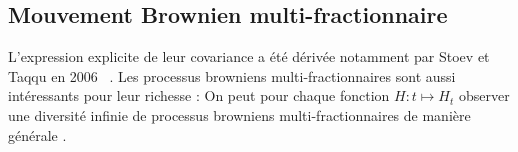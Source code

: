 \subsection{Mouvement Brownien multi-fractionnaire}

L'expression explicite de leur covariance a été dérivée notamment par Stoev et Taqqu en 2006 ~\cite{mfbm-howrich}. Les processus browniens multi-fractionnaires sont aussi intéressants pour leur \og richesse \fg : On peut pour chaque fonction $H : t \mapsto H_t$ observer \og une diversité infinie de processus browniens multi-fractionnaires de manière générale \fg.~\cite{mfbm-howrich}